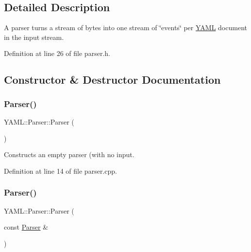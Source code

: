 \subsection{Detailed Description}
A parser turns a stream of bytes into one stream of \char`\"{}events\char`\"{} per \mbox{\hyperlink{namespace_y_a_m_l}{Y\+A\+ML}} document in the input stream. 

Definition at line 26 of file parser.\+h.



\subsection{Constructor \& Destructor Documentation}
\mbox{\label{class_y_a_m_l_1_1_parser_a0e70f6d93a2179bfeb0f46a8fa29c2e4}} 
\subsubsection{\texorpdfstring{Parser()}{Parser()}\hspace{0.1cm}{\footnotesize\ttfamily [1/4]}}
{\footnotesize\ttfamily Y\+A\+M\+L\+::\+Parser\+::\+Parser (\begin{DoxyParamCaption}{ }\end{DoxyParamCaption})}

Constructs an empty parser (with no input. 

Definition at line 14 of file parser.\+cpp.

\mbox{\label{class_y_a_m_l_1_1_parser_ae50ae1f48cf0eaa1c0f661a1e7e342e1}} 
\subsubsection{\texorpdfstring{Parser()}{Parser()}\hspace{0.1cm}{\footnotesize\ttfamily [2/4]}}
{\footnotesize\ttfamily Y\+A\+M\+L\+::\+Parser\+::\+Parser (\begin{DoxyParamCaption}\item[{const \mbox{\hyperlink{class_y_a_m_l_1_1_parser}{Parser}} \&}]{ }\end{DoxyParamCaption})\hspace{0.3cm}{\ttfamily [delete]}}

